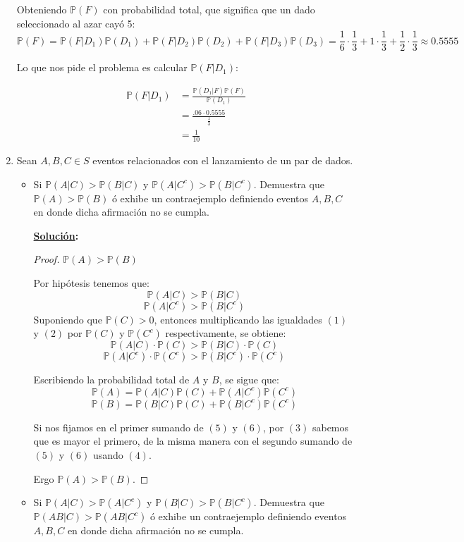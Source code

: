 \documentclass[11pt,letterpaper]{report}
\newcommand{\Pro}{\mathds{P}}
\newcommand{\sol}{\textbf{\underline{Solución}: }} %
\begin{document}
\begin{enumerate}
Obteniendo $\Pro(F)$ con probabilidad total, que significa que un dado seleccionado al azar cayó 5:
\[
    \Pro(F)
        = \Pro(F | D_1) \Pro(D_1) + \Pro(F | D_2) \Pro(D_2) + \Pro(F | D_3) \Pro(D_3)
        = \frac{1}{6} \cdot \frac{1}{3} + 1 \cdot \frac{1}{3} + \frac{1}{2} \cdot \frac{1}{3}
        \approx 0.5555
\]

Lo que nos pide el problema es calcular $\Pro(F | D_1)$:

\begin{align*}
    \Pro(F | D_1)
        &= \frac{\Pro(D_1 | F) \Pro(F)}{\Pro(D_1)}\\
        &= \frac{.06 \cdot 0.5555}{\frac{1}{3}}\\
        &= \frac{1}{10}
\end{align*}

\item Sean $A, B, C \in S$ eventos relacionados con el lanzamiento de un par de dados.
\begin{itemize}
    \item Si $\Pro(A|C) > \Pro(B|C)$ y $\Pro(A|C^c)>\Pro(B|C^c)$.
    Demuestra que $\Pro(A)>\Pro(B)$ ó exhibe un contraejemplo definiendo eventos $A, B, C$ en donde
    dicha afirmación no se cumpla.

    \sol \begin{proof} $\Pro(A)>\Pro(B)$

        Por hipótesis tenemos que:
        \[  \Pro(A|C)   > \Pro(B|C)   \tag{1}   \]
        \[  \Pro(A|C^c) > \Pro(B|C^c) \tag{2}   \]
        Suponiendo que $\Pro(C)>0$, entonces multiplicando las igualdades $(1)$ y $(2)$
        por $\Pro(C)$ y $\Pro(C^c)$ respectivamente, se obtiene:
        \[  \Pro(A|C) \cdot \Pro(C)     > \Pro(B|C) \cdot \Pro(C)  \tag{3}     \]
        \[  \Pro(A|C^c) \cdot \Pro(C^c) > \Pro(B|C^c) \cdot \Pro(C^c)\tag{4}   \]

        Escribiendo la probabilidad total de $A$ y $B$, se sigue que:
        \[  \Pro(A) = \Pro(A|C) \Pro(C) + \Pro(A|C^c) \Pro(C^c) \tag{5}   \]
        \[  \Pro(B) = \Pro(B|C) \Pro(C) + \Pro(B|C^c) \Pro(C^c) \tag{6}   \]

        Si nos fijamos en el primer sumando de $(5)$ y $(6)$, por $(3)$ sabemos que es mayor el
        primero, de la misma manera con el segundo sumando de $(5)$ y $(6)$ usando $(4)$.

        Ergo $\Pro(A)>\Pro(B)$.
    \end{proof}

    \item Si $\Pro(A|C) > \Pro(A|C^c)$ y $\Pro(B|C)>\Pro(B|C^c)$.
    Demuestra que $\Pro(AB|C) > \Pro(AB|C^c)$ ó exhibe un contraejemplo definiendo eventos 
    $A, B, C$ en donde dicha afirmación no se cumpla.
    

\end{itemize}
\end{enumerate}
\end{document}
